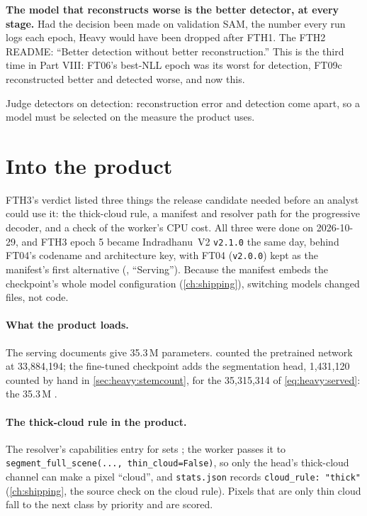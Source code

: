 \textbf{The model that reconstructs worse is the better detector, at every stage.} Had the decision been made on
validation SAM, the number every run logs each epoch, Heavy would have been dropped after FTH1. The FTH2 README:
``Better detection without better reconstruction.'' This is the third time in Part VIII: FT06's best-NLL epoch was
its worst for detection, FT09c reconstructed better and detected worse, and now this.

\begin{keypoint}
Judge detectors on detection: reconstruction error and detection come apart, so a model must be selected on the
measure the product uses.
\end{keypoint}

\section{Into the product}\label{sec:heavy:product}

FTH3's verdict listed three things the release candidate needed before an analyst could use it: the thick-cloud
rule, a manifest and resolver path for the progressive decoder, and a check of the worker's CPU cost. All three were
done on 2026-10-29, and FTH3 epoch 5 became Indradhanu~V2 \texttt{v2.1.0} the same day, behind FT04's codename and
architecture key, with FT04 (\texttt{v2.0.0}) kept as the manifest's first alternative
(, ``Serving''). Because the manifest embeds the checkpoint's whole model
configuration (\cref{ch:shipping}), switching models changed files, not code.

\paragraph{What the product loads.} The serving documents give 35.3\,M parameters.  counted the
pretrained network at 33,884,194; the fine-tuned checkpoint adds the segmentation head, 1,431,120 counted by hand in
\cref{sec:heavy:stemcount}, for the 35,315,314 of \cref{eq:heavy:served}: the 35.3\,M \tagC.

\paragraph{The thick-cloud rule in the product.} The resolver's capabilities entry for 
sets ; the worker passes it to \lstinline!segment_full_scene(..., thin_cloud=False)!, so
only the head's thick-cloud channel can make a pixel ``cloud'', and \texttt{stats.json} records
\texttt{cloud\_rule: "thick"} (\cref{ch:shipping}, the source check on the cloud rule). Pixels that are only thin
cloud fall to the next class by priority and are scored.

